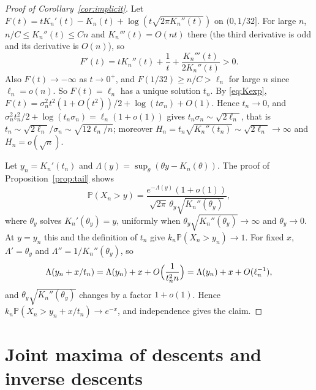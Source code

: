 \documentclass[11pt]{amsart}
\theoremstyle{remark}
\renewcommand{\P}{\mathbb{P}}
\begin{document}
\begin{proof}[Proof of Corollary~\ref{cor:implicit}]
Let $F(t)=tK_n'(t)-K_n(t)+\log(t\sqrt{2\pi K_n''(t)})$ on $(0,1/32]$. For large $n$, $n/C\le K_n''(t)\le Cn$ and $K_n'''(t)=O(nt)$ there (the third derivative is odd and its derivative is $O(n)$), so
\[
F'(t)=tK_n''(t)+\frac1t+\frac{K_n'''(t)}{2K_n''(t)}>0.
\]
Also $F(t)\to-\infty$ as $t\to0^+$, and $F(1/32)\ge n/C>\ell_n$ for large $n$ since $\ell_n=o(n)$. So $F(t)=\ell_n$ has a unique solution $t_n$. By \eqref{eq:Kexp}, $F(t)=\sigma_n^2t^2(1+O(t^2))/2+\log(t\sigma_n)+O(1)$. Hence $t_n\to0$, and $\sigma_n^2t_n^2/2+\log(t_n\sigma_n)=\ell_n(1+o(1))$ gives $t_n\sigma_n\sim\sqrt{2\ell_n}$, that is $t_n\sim\sqrt{2\ell_n}/\sigma_n\sim\sqrt{12\ell_n/n}$; moreover $H_n=t_n\sqrt{K_n''(t_n)}\sim\sqrt{2\ell_n}\to\infty$ and $H_n=o(\sqrt n)$.

Let $y_n=K_n'(t_n)$ and $\Lambda(y)=\sup_\theta(\theta y-K_n(\theta))$. The proof of Proposition~\ref{prop:tail} shows
\[
\P(X_n>y)=\frac{e^{-\Lambda(y)}(1+o(1))}{\sqrt{2\pi}\,\theta_y\sqrt{K_n''(\theta_y)}},
\]
where $\theta_y$ solves $K_n'(\theta_y)=y$, uniformly when $\theta_y\sqrt{K_n''(\theta_y)}\to\infty$ and $\theta_y\to0$. At $y=y_n$ this and the definition of $t_n$ give $k_n\P(X_n>y_n)\to1$. For fixed $x$, $\Lambda'=\theta_y$ and $\Lambda''=1/K_n''(\theta_y)$, so
\[
\Lambda(y_n+x/t_n)=\Lambda(y_n)+x+O\Bigl(\frac{1}{t_n^2n}\Bigr)=\Lambda(y_n)+x+O(\ell_n^{-1}),
\]
and $\theta_y\sqrt{K_n''(\theta_y)}$ changes by a factor $1+o(1)$. Hence $k_n\P(X_n>y_n+x/t_n)\to e^{-x}$, and independence gives the claim.
\end{proof}

\section{Joint maxima of descents and inverse descents}\label{sec:joint}
\end{document}
